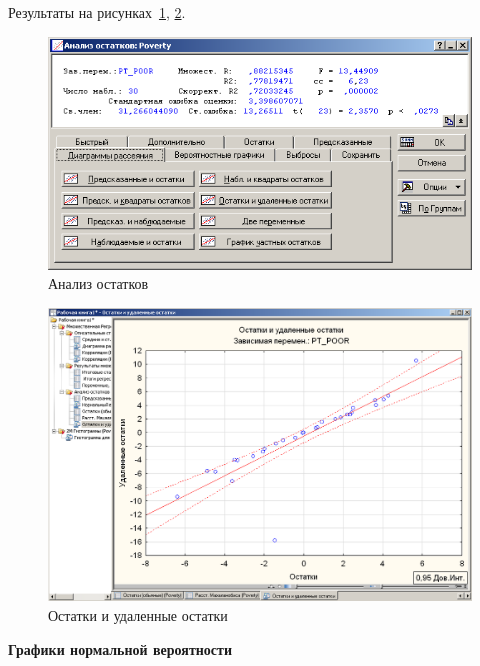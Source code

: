Результаты на рисунках~\ref{fig:example_33}, \ref{fig:example_34}.

\begin{figure}[!h]
  \centering

  \includegraphics[width=16cm]
  {inc/example_33.PNG}

  \caption{Анализ остатков}

  \label{fig:example_33}
\end{figure}

\begin{figure}[!h]
  \centering

  \includegraphics[width=16cm]
  {inc/example_34.PNG}

  \caption{Остатки и удаленные остатки}

  \label{fig:example_34}
\end{figure}

\newpage

\textbf{Графики нормальной вероятности}

